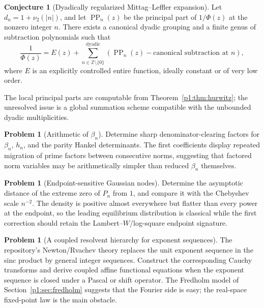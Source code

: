 \documentclass[11pt]{article}
\theoremstyle{definition}
\newtheorem{conjecture}[theorem]{Conjecture}
\newtheorem{problem}[theorem]{Problem}
\theoremstyle{remark}
\begin{document}
\begin{conjecture}[Dyadically regularized Mittag--Leffler expansion]\label{p1:conj:ML}
Let \(d_n=1+\nu_2(|n|)\), and let \(\operatorname{PP}_n(z)\) be the principal part of
\(1/\Phi(z)\) at the nonzero integer \(n\).  There exists a canonical dyadic grouping and a
finite genus of subtraction polynomials such that
\begin{equation}
 \frac1{\Phi(z)}
 =E(z)+\sum_{n\in\mathbb Z\setminus\{0\}}^{\mathrm{dyadic}}
 \left(\operatorname{PP}_n(z)-\text{canonical subtraction at }n\right), \label{p1:eq:ML-conj}
\end{equation}
where \(E\) is an explicitly controlled entire function, ideally constant or of very low
order.
\end{conjecture}

The local principal parts are computable from Theorem~\ref{p1:thm:hurwitz}; the unresolved
issue is a global summation scheme compatible with the unbounded dyadic multiplicities.

\begin{problem}[Arithmetic of \(\beta_n\)]
Determine sharp denominator-clearing factors for \(\beta_n\), \(h_n\), and the parity
Hankel determinants.  The first coefficients display repeated migration of prime factors
between consecutive norms, suggesting that factored norm variables may be arithmetically
simpler than reduced \(\beta_n\) themselves.
\end{problem}

\begin{problem}[Endpoint-sensitive Gaussian nodes]
Determine the asymptotic distance of the extreme zero of \(P_n\) from \(1\), and compare it
with the Chebyshev scale \(n^{-2}\).  The density is positive almost everywhere but flatter
than every power at the endpoint, so the leading equilibrium distribution is classical
while the first correction should retain the Lambert--\(W\)/log-square endpoint signature.
\end{problem}

\begin{problem}[A coupled resolvent hierarchy for exponent sequences]
The repository's Newton/Rvachev theory replaces the unit exponent sequence in the sinc
product by general integer sequences.  Construct the corresponding Cauchy transforms and
derive coupled affine functional equations when the exponent sequence is closed under a
Pascal or shift operator.  The Fredholm model of Section~\ref{p1:sec:fredholm} suggests that
the Fourier side is easy; the real-space fixed-point law is the main obstacle.
\end{problem}
\end{document}
